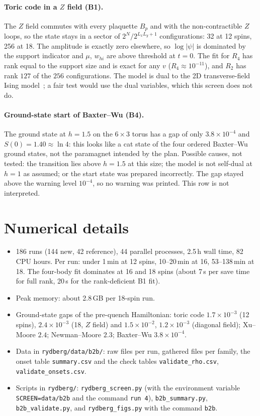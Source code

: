 \documentclass[11pt,a4paper]{article}
\newcommand{\whi}{w_{hi}}
\begin{document}
\paragraph{Toric code in a $Z$ field (B1).} The $Z$ field commutes with every plaquette $B_p$ and with the
non-contractible $Z$ loops, so the state stays in a sector of $2^{N}/2^{L_xL_y+1}$ configurations: 32 at 12 spins, 256
at 18. The amplitude is exactly zero elsewhere, so $\log\lvert\psi\rvert$ is dominated by the support indicator and
$\mu$, $\whi$ are above threshold at $t=0$. The fit for $R_4$ has rank equal to the support size and is exact for any
$v$ ($R_4\approx10^{-11}$), and $R_2$ has rank $127$ of the $256$ configurations. The model is dual to the 2D
transverse-field Ising model~\cite{Wegner71}; a fair test would use the dual variables, which this screen does not do.

\paragraph{Ground-state start of Baxter--Wu (B4).} The ground state at $h=1.5$ on the $6\times3$ torus has a gap of
only $3.8\times10^{-4}$ and $S(0)=1.40\approx\ln4$: this looks like a cat state of the four ordered Baxter--Wu
ground states, not the paramagnet intended by the plan. Possible causes, not tested: the transition lies above $h=1.5$
at this size; the model is not self-dual at $h=1$ as assumed; or the start state was prepared incorrectly. The gap stayed above the warning level $10^{-4}$, so no warning was
printed. This row is not interpreted.

\section{Numerical details}
\label{app:numerics}
\begin{itemize}
  \item 186 runs (144 new, 42 reference), 44 parallel processes, 2.5\,h wall time, 82 CPU hours. Per run: under 1\,min
    at 12 spins, 10--20\,min at 16, 53--138\,min at 18. The four-body fit dominates at 16 and 18 spins (about 7\,s per save
    time for full rank, 20\,s for the rank-deficient B1 fit).
  \item Peak memory: about 2.8\,GB per 18-spin run.
  \item Ground-state gaps of the pre-quench Hamiltonian: toric code $1.7\times10^{-3}$ (12 spins), $2.4\times10^{-3}$ (18,
    $Z$ field) and $1.5\times10^{-2}$, $1.2\times10^{-3}$ (diagonal field); Xu--Moore $2.4$; Newman--Moore $2.3$; Baxter--Wu
    $3.8\times10^{-4}$.
  \item Data in \texttt{rydberg/data/b2b/}: raw files per run, gathered files per family, the onset table
    \texttt{summary.csv} and the check tables \texttt{validate\_rho.csv}, \texttt{validate\_onsets.csv}.
  \item Scripts in \texttt{rydberg/}: \texttt{rydberg\_screen.py} (with the environment variable
    \texttt{SCREEN=data/b2b} and the command \texttt{run 4}), \texttt{b2b\_summary.py}, \texttt{b2b\_validate.py},
    and \texttt{rydberg\_figs.py} with the command \texttt{b2b}.
\end{itemize}
\end{document}
